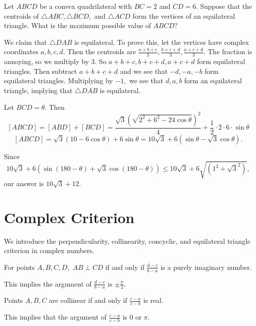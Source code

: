 \documentclass{article}
\begin{document}
\begin{exam}[AMC 12B 2019/25]
Let $ABCD$ be a convex quadrilateral with $BC=2$ and $CD=6.$ Suppose that the centroids of $\triangle ABC,\triangle BCD,$ and $\triangle ACD$ form the vertices of an equilateral triangle. What is the maximum possible value of $ABCD?$
\end{exam}

\begin{sol}
We claim that $\triangle DAB$ is equilateral. To prove this, let the vertices have complex coordinates $a,b,c,d.$ Then the centroids are $\frac{a+b+c}{3},\frac{b+c+d}{3},\frac{a+c+d}{3}.$ The fraction is annoying, so we multiply by $3.$ So $a+b+c,b+c+d,a+c+d$ form equilateral triangles. Then subtract $a+b+c+d$ and we see that $-d,-a,-b$ form equilateral triangles. Multiplying by $-1,$ we see that $d,a,b$ form an equilateral triangle, implying that $\triangle DAB$ is equilateral.

Let $BCD=\theta.$ Then
$$[ABCD]=[ABD]+[BCD]=\frac{\sqrt{3}(\sqrt{2^2+6^2-24\cos\theta})^2}{4}+\frac{1}{2}\cdot 2\cdot 6\cdot \sin \theta$$
$$[ABCD]=\sqrt{3}(10-6\cos\theta)+6\sin\theta=10\sqrt{3}+6(\sin\theta-\sqrt{3}\cos\theta).$$

Since
\[10\sqrt{3}+6(\sin(180-\theta)+\sqrt{3}\cos(180-\theta))\leq 10\sqrt{3}+6\sqrt{(1^2+\sqrt{3}^2)},\]
our answer is $10\sqrt{3}+12.$
\end{sol}

\section{Complex Criterion}
We introduce the perpendicularity, collinearity, concyclic, and equilateral triangle criterion in complex numbers.

\begin{theo}
For points $A,B,C,D,$ $AB\perp CD$ if and only if $\frac{d-c}{b-a}$ is a purely imaginary number.
\end{theo}

\begin{pro}
This implies the argument of $\frac{d-c}{b-a}$ is $\pm \frac{\pi}{2}.$
\end{pro}

\begin{theo}
Points $A,B,C$ are collinear if and only if $\frac{c-a}{c-b}$ is real.
\end{theo}

\begin{pro}
This implies that the argument of $\frac{c-a}{c-b}$ is $0$ or $\pi.$
\end{pro}
\end{document}
